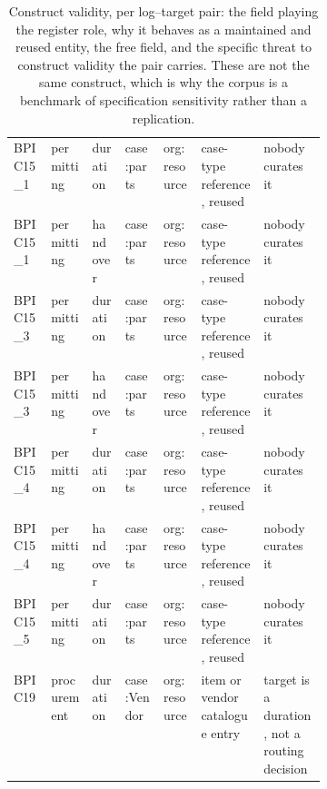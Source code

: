 \begin{table}[t]
{\begin{tabular}{lllll>{\raggedright\arraybackslash}p{0.200\linewidth}>{\raggedright\arraybackslash}p{0.200\linewidth}}
BPIC15\_1 & permitting & duration & case:parts & org:resource & case-type reference, reused & nobody curates it \\
BPIC15\_1 & permitting & handover & case:parts & org:resource & case-type reference, reused & nobody curates it \\
BPIC15\_3 & permitting & duration & case:parts & org:resource & case-type reference, reused & nobody curates it \\
BPIC15\_3 & permitting & handover & case:parts & org:resource & case-type reference, reused & nobody curates it \\
BPIC15\_4 & permitting & duration & case:parts & org:resource & case-type reference, reused & nobody curates it \\
BPIC15\_4 & permitting & handover & case:parts & org:resource & case-type reference, reused & nobody curates it \\
BPIC15\_5 & permitting & duration & case:parts & org:resource & case-type reference, reused & nobody curates it \\
BPIC19 & procurement & duration & case:Vendor & org:resource & item or vendor catalogue entry & target is a duration, not a routing decision \\
\bottomrule
\end{tabular}%
}
\caption{Construct validity, per log--target pair: the field playing the register role, why it behaves as a maintained and reused entity, the free field, and the specific threat to construct validity the pair carries. These are not the same construct, which is why the corpus is a benchmark of specification sensitivity rather than a replication.}
\label{tab:construct}
\end{table}
